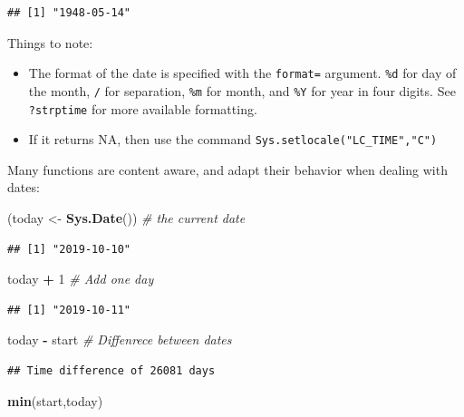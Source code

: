 \documentclass[]{book}
\newenvironment{Shaded}{\begin{snugshade}}{\end{snugshade}}
\newcommand{\CommentTok}[1]{\textcolor[rgb]{0.56,0.35,0.01}{\textit{#1}}}
\newcommand{\DecValTok}[1]{\textcolor[rgb]{0.00,0.00,0.81}{#1}}
\newcommand{\KeywordTok}[1]{\textcolor[rgb]{0.13,0.29,0.53}{\textbf{#1}}}
\newcommand{\NormalTok}[1]{#1}
\newcommand{\OperatorTok}[1]{\textcolor[rgb]{0.81,0.36,0.00}{\textbf{#1}}}
\newcommand{\StringTok}[1]{\textcolor[rgb]{0.31,0.60,0.02}{#1}}
\providecommand{\tightlist}{%
  \setlength{\itemsep}{0pt}\setlength{\parskip}{0pt}}
\theoremstyle{definition}
\theoremstyle{definition}
\theoremstyle{definition}
\theoremstyle{remark}
\begin{document}
\begin{verbatim}
## [1] "1948-05-14"
\end{verbatim}

Things to note:

\begin{itemize}
\tightlist
\item
  The format of the date is specified with the \texttt{format=} argument.
  \texttt{\%d} for day of the month, \texttt{/} for separation, \texttt{\%m} for month, and \texttt{\%Y} for year in four digits. See \texttt{?strptime} for more available formatting.
\item
  If it returns NA, then use the command \texttt{Sys.setlocale("LC\_TIME","C")}
\end{itemize}

Many functions are content aware, and adapt their behavior when dealing with dates:

\begin{Shaded}
\begin{Highlighting}[]
\NormalTok{(today <-}\StringTok{ }\KeywordTok{Sys.Date}\NormalTok{()) }\CommentTok{# the current date}
\end{Highlighting}
\end{Shaded}

\begin{verbatim}
## [1] "2019-10-10"
\end{verbatim}

\begin{Shaded}
\begin{Highlighting}[]
\NormalTok{today }\OperatorTok{+}\StringTok{ }\DecValTok{1} \CommentTok{# Add one day}
\end{Highlighting}
\end{Shaded}

\begin{verbatim}
## [1] "2019-10-11"
\end{verbatim}

\begin{Shaded}
\begin{Highlighting}[]
\NormalTok{today }\OperatorTok{-}\StringTok{ }\NormalTok{start }\CommentTok{# Diffenrece between dates}
\end{Highlighting}
\end{Shaded}

\begin{verbatim}
## Time difference of 26081 days
\end{verbatim}

\begin{Shaded}
\begin{Highlighting}[]
\KeywordTok{min}\NormalTok{(start,today)}
\end{Highlighting}
\end{Shaded}
\end{document}
